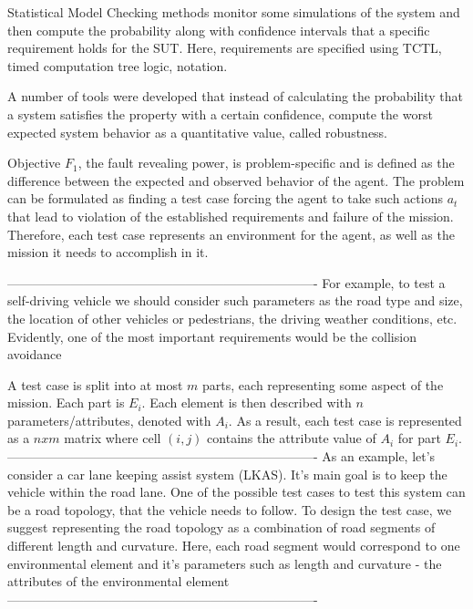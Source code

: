 Statistical Model Checking methods monitor some simulations of the system and then compute the probability along with confidence intervals that a specific requirement holds for the SUT. Here, requirements are specified using TCTL, timed computation tree logic, notation.

A number of tools were developed that instead of calculating the probability that a system satisfies the property with a certain confidence, compute the worst expected system behavior as a quantitative value, called robustness.


Objective $ F_1 $, the fault revealing power, is problem-specific and is defined as the difference between the expected and observed behavior of the agent.
The problem can be formulated as finding a test case forcing the agent to take such actions $ a_t $ that lead to violation of the established requirements and failure of the mission.
Therefore, each test case represents an environment for the agent, as well as the mission it needs to accomplish in it.


-------------------------------------------------------------------------\newline
For example, to test a self-driving vehicle we should
consider such parameters as the road type and size, the
location of other vehicles or pedestrians, the driving weather
conditions, etc. Evidently, one of the most important requirements would be the collision avoidance


A test case is split into at most $ m $ parts, each representing some aspect of the mission. Each part is $ E_i $.
Each element is then described with $ n $ parameters/attributes, denoted with $ A_i $.
As a result, each test case is represented as a $ nxm $ matrix where cell $ (i, j) $ contains the attribute value of $ A_i $ for part $ E_i $.
-------------------------------------------------------------------------\newline
As an example, let’s consider a car lane keeping assist
system (LKAS). It’s main goal is to keep the vehicle within
the road lane. One of the possible test cases to test this system
can be a road topology, that the vehicle needs to follow. To
design the test case, we suggest representing the road topology as a combination of road segments of different length
and curvature. Here, each road segment would correspond
to one environmental element and it’s parameters such as
length and curvature - the attributes of the environmental
element
-------------------------------------------------------------------------\newline

